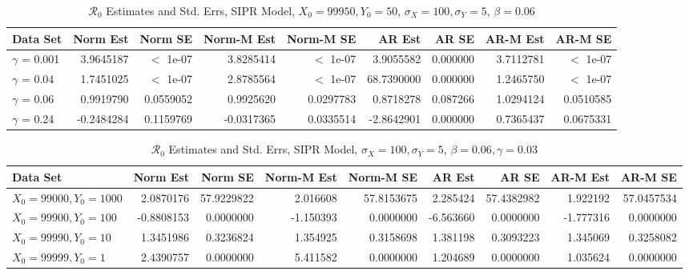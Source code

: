 \documentclass[12pt]{article}
\newcommand{\rr}{\ensuremath{\mathcal{R}_0}}
\begin{document}
\begin{table}[H]
	
	\caption{\label{tab:}$\rr$ Estimates and Std. Errs, SIPR Model,
		$X_0 = 99950, Y_0 = 50$, $\sigma_X = 100, \sigma_Y = 5$, $\beta = 0.06$}
	\centering
	\begin{footnotesize}
		\begin{tabular}[t]{l|r|r|r|r|r|r|r|r}
			\hline
			Data Set & Norm Est & Norm SE & Norm-M Est & Norm-M SE & AR Est & AR SE & AR-M Est & AR-M SE\\
			\hline
			$\gamma$ = 0.001 & 3.9645187 & $<$ 1e-07 & 3.8285414 & $<$ 1e-07 & 3.9055582 & 0.000000 & 3.7112781 & $<$ 1e-07 \\
			\hline
			$\gamma$ = 0.04 & 1.7451025 & $<$ 1e-07 & 2.8785564 & $<$ 1e-07 & 68.7390000 & 0.000000 & 1.2465750 & $<$ 1e-07 \\
			\hline
			$\gamma$ = 0.06 & 0.9919790 & 0.0559052 & 0.9925620 & 0.0297783 & 0.8718278 & 0.087266 & 1.0294124 & 0.0510585\\
			\hline
			$\gamma$ = 0.24 & -0.2484284 & 0.1159769 & -0.0317365 & 0.0335514 & -2.8642901 & 0.000000 & 0.7365437 & 0.0675331\\
			\hline
		\end{tabular}
	\end{footnotesize}
\end{table}

\begin{table}[H]
	
	\caption{\label{tab:}$\rr$ Estimates and Std. Errs, SIPR Model,
		$\sigma_X = 100, \sigma_Y = 5$, $\beta = 0.06, \gamma = 0.03$}
	\centering
	\begin{footnotesize}
		\begin{tabular}[t]{l|r|r|r|r|r|r|r|r}
			\hline
			Data Set & Norm Est & Norm SE & Norm-M Est & Norm-M SE & AR Est & AR SE & AR-M Est & AR-M SE\\
			\hline
			$X_0 = 99000, Y_0 = 1000$ & 2.0870176 & 57.9229822 & 2.016608 & 57.8153675 & 2.285424 & 57.4382982 & 1.922192 & 57.0457534\\
			\hline
			$X_0 = 99900, Y_0 = 100$ & -0.8808153 & 0.0000000 & -1.150393 & 0.0000000 & -6.563660 & 0.0000000 & -1.777316 & 0.0000000\\
			\hline
			$X_0 = 99990, Y_0 = 10$ & 1.3451986 & 0.3236824 & 1.354925 & 0.3158698 & 1.381198 & 0.3093223 & 1.345069 & 0.3258082\\
			\hline
			$X_0 = 99999, Y_0 = 1$ & 2.4390757 & 0.0000000 & 5.411582 & 0.0000000 & 1.204689 & 0.0000000 & 1.035624 & 0.0000000\\
			\hline
		\end{tabular}
	\end{footnotesize}
\end{table}
\end{document}
